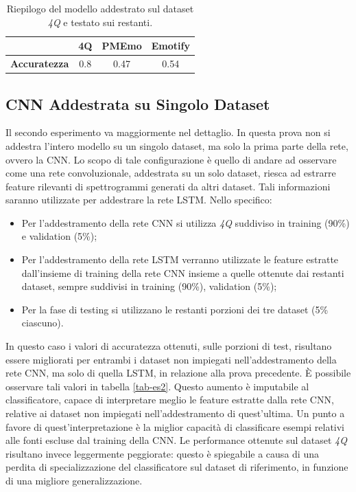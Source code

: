 \documentclass[11pt]{report}
\begin{document}
\newpage

\begin{table}[h]
\caption{Riepilogo del modello addestrato sul dataset \textit{4Q} e testato sui restanti.}
\label{tab-es1}
\centering
\begin{tabular}{|c|c|c|c|}
\hline
&\textbf{4Q} &  \textbf{PMEmo} & \textbf{Emotify}\\
\hline
\textbf{Accuratezza} & 0.8  & 0.47 & 0.54\\
\hline
\end{tabular}
\end{table}






\subsection{CNN Addestrata su Singolo Dataset}

Il secondo esperimento va maggiormente nel dettaglio. In questa prova non si addestra l'intero modello su un singolo dataset, ma solo la prima parte della rete, ovvero la CNN. Lo scopo di tale configurazione è quello di andare ad osservare come una rete convoluzionale, addestrata su un solo dataset, riesca ad estrarre feature rilevanti di spettrogrammi generati da altri dataset. Tali informazioni saranno utilizzate per addestrare la rete LSTM. Nello specifico:
\begin{itemize}
    \item Per l'addestramento della rete CNN si utilizza \textit{4Q} suddiviso in training (90\%) e validation (5\%);
    \item Per l'addestramento della rete LSTM verranno utilizzate le feature estratte dall'insieme di training della rete CNN insieme a quelle ottenute dai restanti dataset, sempre suddivisi in training (90\%), validation (5\%);
    \item Per la fase di testing si utilizzano le restanti porzioni dei tre dataset (5\% ciascuno).
\end{itemize}

In questo caso i valori di accuratezza ottenuti, sulle porzioni di test, risultano essere migliorati per entrambi i dataset non impiegati nell'addestramento della rete CNN, ma solo di quella LSTM, in relazione alla prova precedente. È possibile osservare tali valori in tabella \ref{tab-es2}. Questo aumento è imputabile al classificatore, capace di interpretare meglio le feature estratte dalla rete CNN, relative ai dataset non impiegati nell'addestramento di quest'ultima. Un punto a favore di quest'interpretazione è la miglior capacità di classificare esempi relativi alle fonti escluse dal training della CNN. Le performance ottenute sul dataset \textit{4Q} risultano invece leggermente peggiorate: questo è spiegabile a causa di una perdita di specializzazione del classificatore sul dataset di riferimento, in funzione di una migliore generalizzazione.
\end{document}
